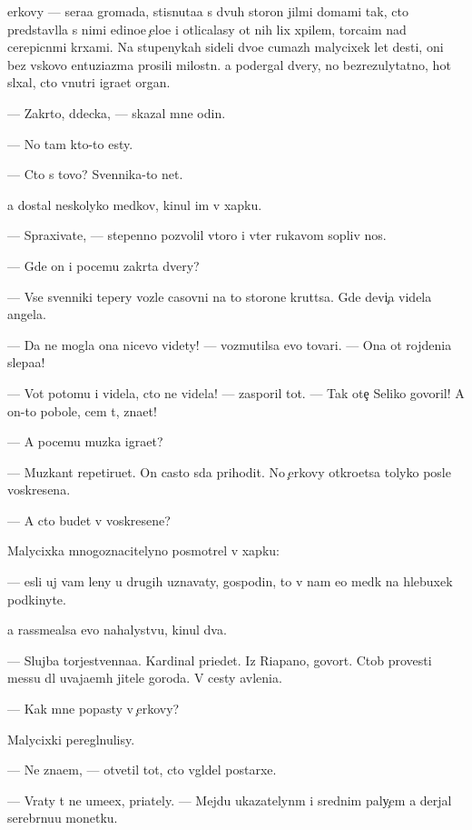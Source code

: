 \documentclass[10pt]{book}
\begin{document}
{\C}erkovy — sera{\y}a gromada, stisnuta{\y}a s dvuh storon jil{\yi}mi domami tak, cto predstavl{\ia}la s nimi {\y}edino{\y}e {\c}elo{\y}e i otlicalasy ot nih lix xpilem, torca{\x}im nad cerepicn{\yi}mi kr{\yi}xami. Na stupenykah sideli dvo{\y}e cumaz{\yi}h malycixek let des{\ia}ti, oni bez vs{\ia}kovo entuziazma prosili milost{\yi}n{\iu}. {\Y}a podergal dvery, no bezrezulytatno, hot{\ia} sl{\yi}xal, cto vnutri igra{\y}et organ.

— Zakr{\yi}to, d{\ia}decka, — skazal mne odin.

— No tam kto-to {\y}esty.

— Cto s tovo? Sv{\ia}{\x}ennika-to net.

{\Y}a dostal neskolyko med{\ia}kov, kinul im v xapku.

— Spraxiva{\y}te, — stepenno pozvolil vtoro{\y} i v{\yi}ter rukavom sopliv{\yi}{\y} nos.

— Gde on i pocemu zakr{\yi}ta dvery?

— Vse sv{\ia}{\x}enniki tepery vozle casovni na to{\y} storone krut{\ia}tsa. Gde devi{\c}a videla angela.

— Da ne mogla ona nicevo videty! — vozmutilsa {\y}evo tovari{\x}. — Ona ot rojdeni{\y}a slepa{\y}a!

— Vot potomu i videla, cto ne videla! — zasporil tot. — Tak ote{\c} Seliko govoril! A on-to pobole, cem t{\yi}, zna{\y}et!

— A pocemu muz{\yi}ka igra{\y}et?

— Muz{\yi}kant repetiru{\y}et. On casto s{\iu}da prihodit. No {\c}erkovy otkro{\y}etsa tolyko posle voskresen{\y}a.

— A cto budet v voskresen{\y}e?

Malycixka mnogoznacitelyno posmotrel v xapku:

— {\Y}esli uj vam leny u drugih uznavaty, gospodin, to v{\yi} nam {\y}e{\x}o med{\ia}k na hlebuxek podkinyte.

{\Y}a rassme{\y}alsa {\y}evo nahalystvu, kinul dva.

— Slujba torjestvenna{\y}a. Kardinal pri{\y}edet. Iz Riapano, govor{\ia}t. Ctob{\yi} provesti messu dl{\ia} uvaja{\y}em{\yi}h jitele{\y} goroda. V cesty {\y}avleni{\y}a.

— Kak mne popasty v {\c}erkovy?

Malycixki peregl{\ia}nulisy.

— Ne zna{\y}em, — otvetil tot, cto v{\yi}gl{\ia}del postarxe.

— Vraty t{\yi} ne ume{\y}ex, pri{\y}ately. — Mejdu ukazatelyn{\yi}m i srednim paly{\c}em {\y}a derjal serebr{\ia}nu{\y}u monetku.
\end{document}
